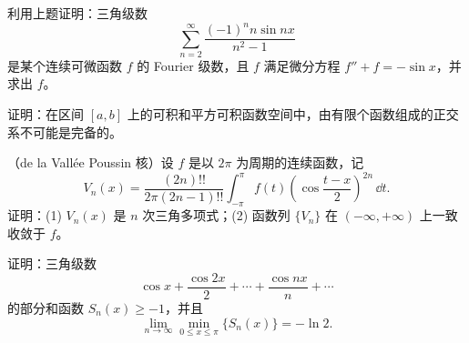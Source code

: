 \begin{xreferenceproblem}[17]
利用上题证明：三角级数
  \[
    \sum_{n=2}^{\infty}\frac{(-1)^n n\sin nx}{n^2-1}
  \]
  是某个连续可微函数 $f$ 的 Fourier 级数，且 $f$ 满足微分方程 $f''+f=-\sin x$，并求出 $f$。
\end{xreferenceproblem}

\begin{xreferenceproblem}[18]
证明：在区间 $[a,b]$ 上的可积和平方可积函数空间中，由有限个函数组成的正交系不可能是完备的。
\end{xreferenceproblem}

\begin{xreferenceproblem}[19]
（de la Vallée Poussin 核）设 $f$ 是以 $2\pi$ 为周期的连续函数，记
  \[
    V_n(x)=\frac{(2n)!!}{2\pi(2n-1)!!}\int_{-\pi}^{\pi}f(t)\left(\cos\frac{t-x}{2}\right)^{2n}\,\dd t.
  \]
  证明：(1) $V_n(x)$ 是 $n$ 次三角多项式；(2) 函数列 $\{V_n\}$ 在 $(-\infty,+\infty)$ 上一致收敛于 $f$。
\end{xreferenceproblem}

\begin{xreferenceproblem}[20]
证明：三角级数
  \[
    \cos x+\frac{\cos2x}{2}+\cdots+\frac{\cos nx}{n}+\cdots
  \]
  的部分和函数 $S_n(x)\ge-1$，并且
  \[
    \lim_{n\to\infty}\min_{0\le x\le\pi}\{S_n(x)\}=-\ln2.
  \]
\end{xreferenceproblem}

